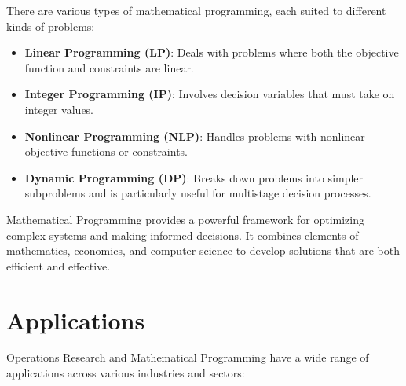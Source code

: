 There are various types of mathematical programming, each suited to different kinds of problems:

\begin{itemize}
    \item \textbf{Linear Programming (LP)}: Deals with problems where both the objective function and constraints are linear.
    \item \textbf{Integer Programming (IP)}: Involves decision variables that must take on integer values.
    \item \textbf{Nonlinear Programming (NLP)}: Handles problems with nonlinear objective functions or constraints.
    \item \textbf{Dynamic Programming (DP)}: Breaks down problems into simpler subproblems and is particularly useful for multistage decision processes.
\end{itemize}

Mathematical Programming provides a powerful framework for optimizing complex systems and making informed decisions. It combines elements of mathematics, economics, and computer science to develop solutions that are both efficient and effective.

\section{Applications}

Operations Research and Mathematical Programming have a wide range of applications across various industries and sectors:

